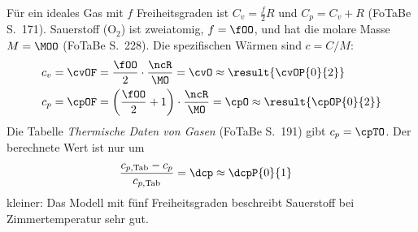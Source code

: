 Für ein ideales Gas mit $f$ Freiheitsgraden ist $C_v = \frac{f}{2}R$ und $C_p = C_v + R$ (FoTaBe S.~171). Sauerstoff (O$_2$) ist zweiatomig, $f = \fOO$, und hat die molare Masse $M = \MOO$ (FoTaBe S.~228). Die spezifischen Wärmen sind $c = C/M$:
\begin{align}
 c_v &= \cvOF = \frac{\fOO}{2}\cdot\frac{\ncR}{\MO} = \cvO \approx \result{\cvOP{0}{2}} \\
 c_p &= \cpOF = \left(\frac{\fOO}{2}+1\right)\cdot\frac{\ncR}{\MO} = \cpO \approx \result{\cpOP{0}{2}}
\end{align}
Die Tabelle \emph{Thermische Daten von Gasen} (FoTaBe S.~191) gibt $c_p = \cpTO$. Der berechnete Wert ist nur um
\begin{align}
 \frac{c_{p,\text{Tab}}-c_p}{c_{p,\text{Tab}}} &= \dcp \approx \dcpP{0}{1}
\end{align}
kleiner: Das Modell mit fünf Freiheitsgraden beschreibt Sauerstoff bei Zimmertemperatur sehr gut.
